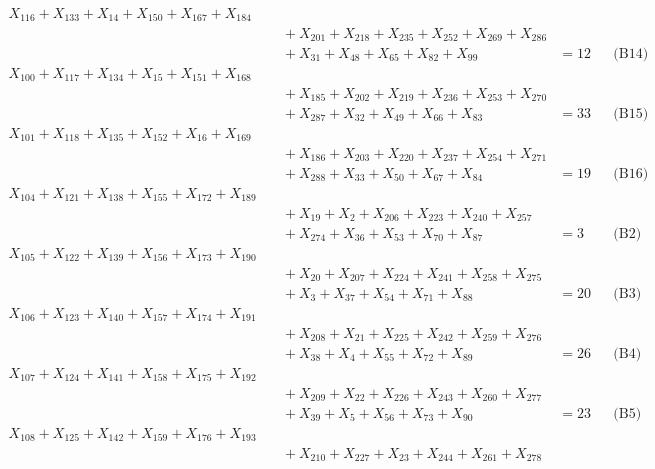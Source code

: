 \documentclass[a4paper,10pt]{article}
\begin{document}
{\begin{align}
X_{116} + X_{133} + X_{14} + X_{150} + X_{167} + X_{184} \\[0.5ex]
&\quad  + X_{201} + X_{218} + X_{235} + X_{252} + X_{269} + X_{286} \\[0.5ex]
&\quad  + X_{31} + X_{48} + X_{65} + X_{82} + X_{99} &= 12 && \text{(B14)} \\
X_{100} + X_{117} + X_{134} + X_{15} + X_{151} + X_{168} \\[0.5ex]
&\quad  + X_{185} + X_{202} + X_{219} + X_{236} + X_{253} + X_{270} \\[0.5ex]
&\quad  + X_{287} + X_{32} + X_{49} + X_{66} + X_{83} &= 33 && \text{(B15)} \\
X_{101} + X_{118} + X_{135} + X_{152} + X_{16} + X_{169} \\[0.5ex]
&\quad  + X_{186} + X_{203} + X_{220} + X_{237} + X_{254} + X_{271} \\[0.5ex]
&\quad  + X_{288} + X_{33} + X_{50} + X_{67} + X_{84} &= 19 && \text{(B16)} \\
X_{104} + X_{121} + X_{138} + X_{155} + X_{172} + X_{189} \\[0.5ex]
&\quad  + X_{19} + X_{2} + X_{206} + X_{223} + X_{240} + X_{257} \\[0.5ex]
&\quad  + X_{274} + X_{36} + X_{53} + X_{70} + X_{87} &= 3 && \text{(B2)} \\
X_{105} + X_{122} + X_{139} + X_{156} + X_{173} + X_{190} \\[0.5ex]
&\quad  + X_{20} + X_{207} + X_{224} + X_{241} + X_{258} + X_{275} \\[0.5ex]
&\quad  + X_{3} + X_{37} + X_{54} + X_{71} + X_{88} &= 20 && \text{(B3)} \\
X_{106} + X_{123} + X_{140} + X_{157} + X_{174} + X_{191} \\[0.5ex]
&\quad  + X_{208} + X_{21} + X_{225} + X_{242} + X_{259} + X_{276} \\[0.5ex]
&\quad  + X_{38} + X_{4} + X_{55} + X_{72} + X_{89} &= 26 && \text{(B4)} \\
X_{107} + X_{124} + X_{141} + X_{158} + X_{175} + X_{192} \\[0.5ex]
&\quad  + X_{209} + X_{22} + X_{226} + X_{243} + X_{260} + X_{277} \\[0.5ex]
&\quad  + X_{39} + X_{5} + X_{56} + X_{73} + X_{90} &= 23 && \text{(B5)} \\
X_{108} + X_{125} + X_{142} + X_{159} + X_{176} + X_{193} \\[0.5ex]
&\quad  + X_{210} + X_{227} + X_{23} + X_{244} + X_{261} + X_{278} \\[0.5ex]

\end{align}}
\end{document}
